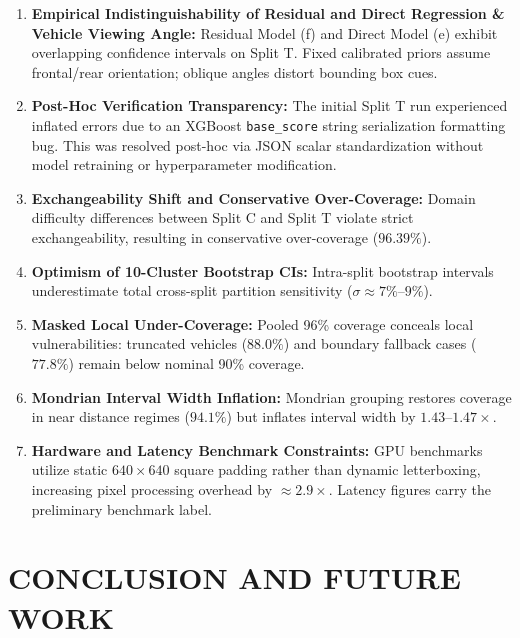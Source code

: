 \documentclass[]{spie}  %
\begin{document}
\begin{enumerate}
    \item \textbf{Empirical Indistinguishability of Residual and Direct Regression \& Vehicle Viewing Angle:} Residual Model (f) and Direct Model (e) exhibit overlapping confidence intervals on Split T. Fixed calibrated priors assume frontal/rear orientation; oblique angles distort bounding box cues.
    \item \textbf{Post-Hoc Verification Transparency:} The initial Split T run experienced inflated errors due to an XGBoost \texttt{base\_score} string serialization formatting bug. This was resolved post-hoc via JSON scalar standardization without model retraining or hyperparameter modification.
    \item \textbf{Exchangeability Shift and Conservative Over-Coverage:} Domain difficulty differences between Split C and Split T violate strict exchangeability, resulting in conservative over-coverage ($96.39\%$).
    \item \textbf{Optimism of 10-Cluster Bootstrap CIs:} Intra-split bootstrap intervals underestimate total cross-split partition sensitivity ($\sigma \approx 7\%\text{--}9\%$).
    \item \textbf{Masked Local Under-Coverage:} Pooled 96\% coverage conceals local vulnerabilities: truncated vehicles ($88.0\%$) and boundary fallback cases ($77.8\%$) remain below nominal 90\% coverage.
    \item \textbf{Mondrian Interval Width Inflation:} Mondrian grouping restores coverage in near distance regimes ($94.1\%$) but inflates interval width by $1.43\text{--}1.47\times$.
    \item \textbf{Hardware and Latency Benchmark Constraints:} GPU benchmarks utilize static $640 \times 640$ square padding rather than dynamic letterboxing, increasing pixel processing overhead by $\approx 2.9\times$. Latency figures carry the preliminary benchmark label.
\end{enumerate}

\section{CONCLUSION AND FUTURE WORK}
\label{sec:conclusion}
\end{document}
